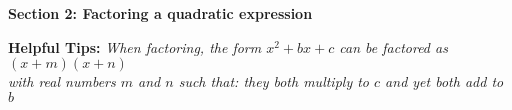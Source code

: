 \documentclass{article}
\begin{document}
\vspace{1cm}
\noindent

\noindent
\textbf{Section 2: Factoring a quadratic expression}

\begin{tcolorbox}[
    width=\linewidth,
    colframe=black,         %
    colback=white,          %
    boxrule=0.5pt,          %
    left=1mm, right=1.1mm,    %
    top=1mm, bottom=1mm,    %
    arc=2mm                 %
]
\textbf{Helpful Tips: } 
\textit{When factoring, the form $x^2 + bx + c$ can be factored as $(x+m)(x+n)$\\
\hspace*{2.5cm} with real numbers $m$ and $n$ such that: they both multiply to $c$ and yet both add to $b$}
\end{tcolorbox}
\end{document}
